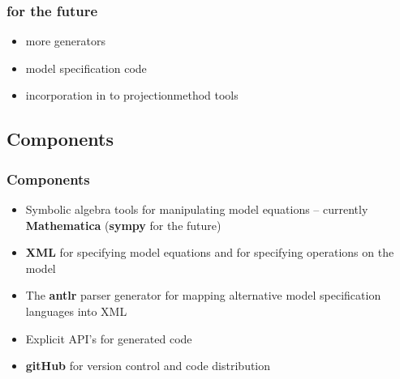 \documentclass[handout]{beamer}
\newcommand{\mma}{Mathematica}
\begin{document}
\begin{frame}
  \frametitle{for the future}
  \begin{itemize}
  \item more generators
  \item model specification code
  \item incorporation in to projectionmethod tools
  \end{itemize}
\end{frame}


\subsection{Components}
\begin{frame}
  \frametitle{Components}  

{\small
  \begin{itemize}
\item Symbolic algebra tools for manipulating model equations
 -- currently {\bf \mma}  ({\bf sympy} for the future)
\item {\bf XML} for specifying model equations and 
for specifying operations on the model
\item The {\bf antlr} parser generator for mapping alternative 
model specification languages into  XML
\item Explicit  API's for generated code
\item {\bf gitHub} for version control and code distribution
  \end{itemize}

}
\end{frame}
\end{document}
